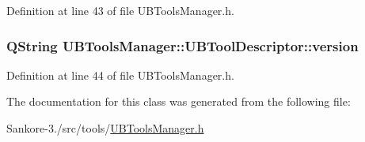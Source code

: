 Definition at line 43 of file U\-B\-Tools\-Manager.\-h.

\hypertarget{class_u_b_tools_manager_1_1_u_b_tool_descriptor_afc91af931f9d49b7386c579ec758121f}{
\subsubsection[{version}]{\setlength{\rightskip}{0pt plus 5cm}Q\-String U\-B\-Tools\-Manager\-::\-U\-B\-Tool\-Descriptor\-::version}}\label{d9/d66/class_u_b_tools_manager_1_1_u_b_tool_descriptor_afc91af931f9d49b7386c579ec758121f}


Definition at line 44 of file U\-B\-Tools\-Manager.\-h.



The documentation for this class was generated from the following file\-:\begin{DoxyCompactItemize}
\item 
Sankore-\/3./src/tools/\hyperlink{_u_b_tools_manager_8h}{U\-B\-Tools\-Manager.\-h}\end{DoxyCompactItemize}

